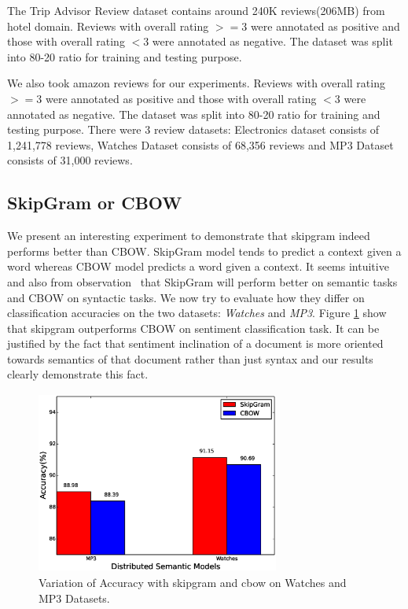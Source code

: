 \documentclass[11pt,a4paper]{article}
\begin{document}
The Trip Advisor Review dataset contains around 240K reviews(206MB) from hotel domain. Reviews with overall rating $>=$3 were annotated as positive and those with overall rating $<$3 were annotated as negative. The dataset was split into 80-20 ratio for training and testing purpose.

We also took amazon reviews for our experiments. Reviews with overall rating $>=$3 were annotated as positive and those with overall rating $<$3 were annotated as negative. The dataset was split into 80-20 ratio for training and testing purpose. There were 3 review datasets: Electronics dataset consists of 1,241,778 reviews, Watches Dataset consists of 68,356 reviews and MP3 Dataset consists of 31,000 reviews.

\subsection{SkipGram or CBOW}
We present an interesting experiment to demonstrate that skipgram indeed performs better than CBOW. SkipGram model tends to predict a context given a word whereas CBOW model predicts a word given a context. It seems intuitive and also from observation~\cite{Mikolov:13b} that SkipGram will perform better on semantic tasks and CBOW on syntactic tasks. We now try to evaluate how they differ on classification accuracies on the two datasets: \emph{Watches} and \emph{MP3}. Figure \ref{fig:accuracy_sgcbow} show that skipgram outperforms CBOW on sentiment classification task. It can be justified by the fact that sentiment inclination of a document is more oriented towards semantics of that document rather than just syntax and our results clearly demonstrate this fact.
\begin{figure}[ht!]
\centering
\includegraphics[width=80mm, height=60mm]{img/accuracy_sgcbow.eps}
\caption{Variation of Accuracy with skipgram and cbow on Watches and MP3 Datasets. \label{fig:accuracy_sgcbow}}
\end{figure}
\end{document}
